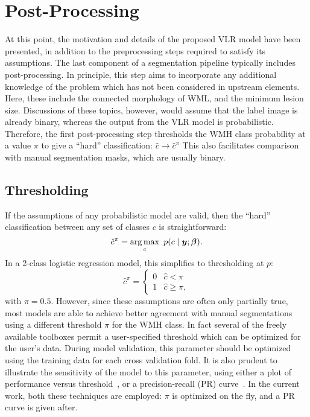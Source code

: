 \section{Post-Processing}\label{s:vlr-post}
At this point, the motivation and details of the proposed VLR model have been presented,
in addition to the preprocessing steps required to satisfy its assumptions.
The last component of a segmentation pipeline typically includes post-processing.
In principle, this step aims to incorporate any additional knowledge of the problem
which has not been considered in upstream elements.
Here, these include the connected morphology of WML, and the minimum lesion size.
Discussions of these topics, however, would assume that the label image is already binary,
whereas the output from the VLR model is probabilistic.
Therefore, the first post-processing step
thresholds the WMH class probability at a value $\pi$ to give a ``hard'' classification:
$\hat{c}\rightarrow \hat{c}^{\pi}$
This also facilitates comparison with manual segmentation masks, which are usually binary.
\subsection{Thresholding}\label{ss:vlr-thr}
If the assumptions of any probabilistic model are valid,
then the ``hard'' classification between any set of classes $c$ is straightforward:
\begin{equation}
  \hat{c}^{\pi} = \underset{c}{\arg\max}\enspace p(c\mid\bm{y};\bm{\beta}).
\end{equation}
In a 2-class logistic regression model, this simplifies to thresholding at $p$:
\begin{equation}
  \hat{c}^{\pi} = \begin{cases} 0 & \hat{c} < \pi \\ 1 & \hat{c} \ge \pi, \end{cases}
\end{equation}
with $\pi = 0.5$.
However, since these assumptions are often only partially true,
most models are able to achieve better agreement with manual segmentations
using a different threshold $\pi$ for the WMH class.
In fact several of the freely available toolboxes
permit a user-specified threshold which can be optimized for the user's data.
During model validation,
this parameter should be optimized using the training data for each cross validation fold.
It is also prudent to illustrate the sensitivity of the model to this parameter, using either
a plot of performance versus threshold~\cite{Steenwijk2013}, or
a precision-recall (PR) curve~\cite{Arbelaez2011}.
In the current work, both these techniques are employed:
$\pi$ is optimized on the fly, and a PR curve is given after.
